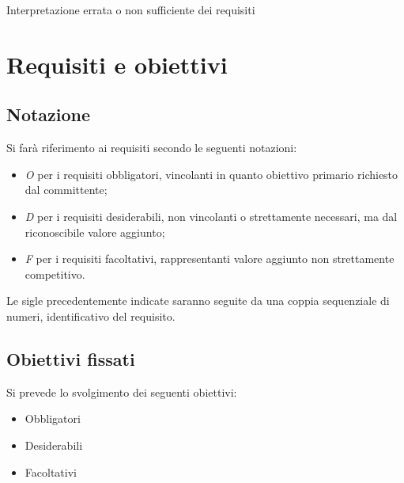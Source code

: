 \begin{risk}{Interpretazione errata o non sufficiente dei requisiti}
    \label{risk:Interpretazione errata o non sufficiente dei requisiti}
\end{risk}
\section{Requisiti e obiettivi}
\subsection*{Notazione}
Si farà riferimento ai requisiti secondo le seguenti notazioni:
\begin{itemize}
    \item \textit{O} per i requisiti obbligatori, vincolanti in quanto
          obiettivo primario richiesto dal committente;
    \item \textit{D} per i requisiti desiderabili, non vincolanti o
          strettamente necessari,
          ma dal riconoscibile valore aggiunto;
    \item \textit{F} per i requisiti facoltativi, rappresentanti valore
          aggiunto non strettamente
          competitivo.
\end{itemize}

Le sigle precedentemente indicate saranno seguite da una coppia sequenziale di
numeri, identificativo del requisito.

\subsection*{Obiettivi fissati}
Si prevede lo svolgimento dei seguenti obiettivi:
\begin{itemize}
    \item Obbligatori
          \begin{itemize}
              \obiettiviObbligatori
          \end{itemize}

    \item Desiderabili
          \begin{itemize}
              \obiettiviDesiderabili
          \end{itemize}

    \item Facoltativi
          \begin{itemize}
              \obiettiviFacoltativi
          \end{itemize}
\end{itemize}


